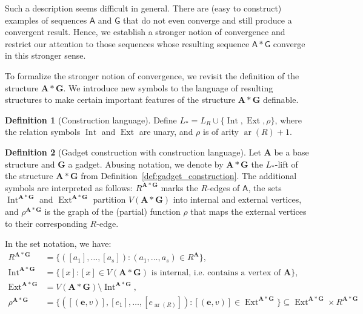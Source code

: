 \documentclass[11pt]{article}
\theoremstyle{plain}
\theoremstyle{definition}
\newtheorem{definition}{Definition}
\theoremstyle{remark}
\DeclareMathOperator\aritysym{ar}
\newcommand{\arity}[1]{{\aritysym({#1})}}
\newcommand{\str}[1]{\mathbf{#1}}
\newcommand{\strseq}[1]{{\boldsymbol{\mathsf{#1}}}}
\newcommand{\tpl}[1]{{\bm{#1}}}
\DeclareMathOperator\Int{Int}
\DeclareMathOperator\Ext{Ext}
\begin{document}
Such a description seems difficult in general.
There are (easy to construct) examples of sequences $\strseq{A}$ and $\strseq{G}$ that do not even converge and still produce a convergent result.
Hence, we establish a stronger notion of convergence and restrict our attention to those sequences whose resulting sequence $\strseq{A}*\strseq{G}$ converge in this stronger sense.

To formalize the stronger notion of convergence, we revisit the definition of the structure $\str{A}*\str{G}$.
We introduce new symbols to the language of resulting structures to make certain important features of the structure $\str{A}*\str{G}$ definable.

\begin{definition}[Construction language]\label{def:construction_language}
    Define $L_* = L_R \cup \{\Int, \Ext, \rho\}$, where the relation symbols $\Int$ and $\Ext$ are unary, and $\rho$ is of arity $\arity{R}+1$.
\end{definition}

\begin{definition}[Gadget construction with construction language]\label{def:gadget_construction_with_construction_language}
    Let $\str{A}$ be a base structure and $\str{G}$ a gadget.
    Abusing notation, we denote by $\str{A}*\str{G}$ the $L_*$-lift of the structure $\str{A}*\str{G}$ from Definition~\ref{def:gadget_construction}.
    The additional symbols are interpreted as follows:
    $R^{\str{A} * \str{G}}$ marks the $R$-edges of $\strseq{A}$, the sets $\Int^{\str{A}*\str{G}}$ and $\Ext^{\str{A}*\str{G}}$ partition $V(\str{A}*\str{G})$ into internal and external vertices, and $\rho^{\str{A}*\str{G}}$ is the graph of the (partial) function $\rho$ that maps the external vertices to their corresponding $R$-edge. 
    
    In the set notation, we have:
    \begin{align*}
        R^{\str{A}*\str{G}}    &= \{([a_1], \dots, [a_s]) : (a_1, \dots, a_s) \in R^\str{A} \}
        ,\\
        \Int^{\str{A}*\str{G}} &= \{[x] : [x] \in V(\str{A} * \str{G}) \text{ is internal, i.e. contains a vertex of }\str{A} \}
        ,\\
        \Ext^{\str{A}*\str{G}} &= V(\str{A} * \str{G}) \setminus \Int^{\str{A}*\str{G}}
        ,\\
        \rho^{\str{A}*\str{G}} &= \{([(\tpl{e}, v)], [e_1], \dots, [e_\arity{R}]) : [(\tpl{e}, v)] \in \Ext^{\str{A}*\str{G}}\} \subseteq \Ext^{\str{A}*\str{G}} \times R^{\str{A}*\str{G}}
    \end{align*}
\end{definition}
\end{document}
